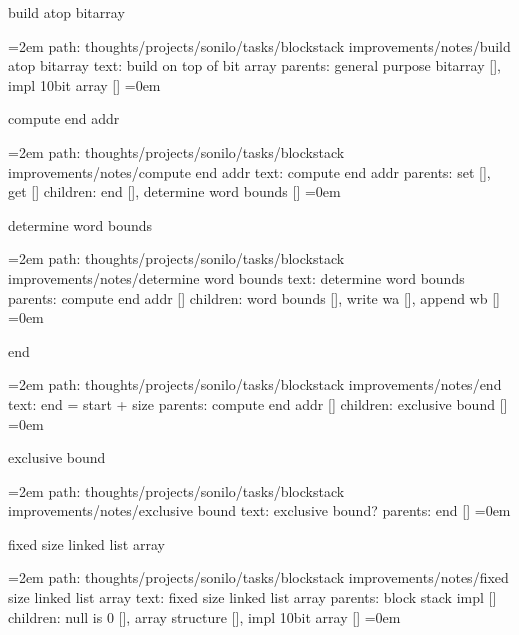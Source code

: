 \bigskip
{}
build atop bitarray
\smallskip
\par\begingroup
\leftskip=2em
path: thoughts/projects/sonilo/tasks/blockstack improvements/notes/build atop bitarray
\smallskip
text:  build on top of bit array
\smallskip
parents:  general purpose bitarray [], impl 10bit array []
\smallskip
\leftskip=0em
\par\endgroup
\bigskip
{}
compute end addr
\smallskip
\par\begingroup
\leftskip=2em
path: thoughts/projects/sonilo/tasks/blockstack improvements/notes/compute end addr
\smallskip
text:  compute end addr
\smallskip
parents:  set [], get []
\smallskip
children: end [], determine word bounds []
\smallskip
\leftskip=0em
\par\endgroup
\bigskip
{}
determine word bounds
\smallskip
\par\begingroup
\leftskip=2em
path: thoughts/projects/sonilo/tasks/blockstack improvements/notes/determine word bounds
\smallskip
text:  determine word bounds
\smallskip
parents:  compute end addr []
\smallskip
children: word bounds [], write wa [], append wb []
\smallskip
\leftskip=0em
\par\endgroup
\bigskip
{}
end
\smallskip
\par\begingroup
\leftskip=2em
path: thoughts/projects/sonilo/tasks/blockstack improvements/notes/end
\smallskip
text:  end = start + size
\smallskip
parents:  compute end addr []
\smallskip
children: exclusive bound []
\smallskip
\leftskip=0em
\par\endgroup
\bigskip
{}
exclusive bound
\smallskip
\par\begingroup
\leftskip=2em
path: thoughts/projects/sonilo/tasks/blockstack improvements/notes/exclusive bound
\smallskip
text:  exclusive bound?
\smallskip
parents:  end []
\smallskip
\leftskip=0em
\par\endgroup
\bigskip
{}
fixed size linked list array
\smallskip
\par\begingroup
\leftskip=2em
path: thoughts/projects/sonilo/tasks/blockstack improvements/notes/fixed size linked list array
\smallskip
text:  fixed size linked list array
\smallskip
parents:  block stack impl []
\smallskip
children: null is 0 [], array structure [], impl 10bit array []
\smallskip
\leftskip=0em
\par\endgroup
